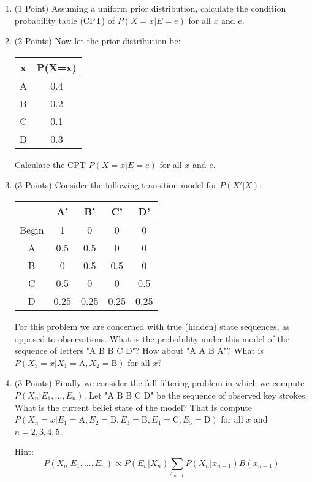 \documentclass[]{article}
\begin{document}
\begin{enumerate}[label=(\alph*)]
    \item (1 Point) Assuming a uniform prior distribution, calculate the condition probability table (CPT) of $P(X=x | E=e)$ for all $x$ and $e$.
    \item (2 Points) Now let the prior distribution be:
    \begin{table}[htb]
    \centering
        \begin{tabular}{|c|c|}
          \hline
            x & P(X=x) \\\hline
            A & 0.4 \\\hline
            B & 0.2 \\\hline
            C & 0.1 \\\hline
            D & 0.3 \\\hline
        \end{tabular}
    \end{table}
    
    Calculate the CPT $P(X=x | E=e)$ for all $x$ and $e$.
    \item (3 Points) Consider the following transition model for $P(X' | X)$:
    \begin{table}[!htb]
    \centering
        \begin{tabular}{|c|c|c|c|c|}
          \hline
             & A' & B' & C' & D' \\\hline
            Begin & 1 & 0 & 0 & 0 \\\hline
            A & 0.5 & 0.5 & 0 & 0 \\\hline
            B & 0 & 0.5 & 0.5 & 0 \\\hline
            C & 0.5 & 0 & 0 & 0.5 \\\hline
            D & 0.25 & 0.25 & 0.25 & 0.25 \\\hline
        \end{tabular}
    \end{table}
    
    For this problem we are concerned with true (hidden) state sequences, as opposed to observations. What is the probability under this model of the sequence of letters "A B B C D"? How about "A A B A"? What is $P(X_3=x | X_1 = \mathrm{A}, X_2 = \mathrm{B})$ for all $x$?
    
    \item (3 Points) Finally we consider the full filtering problem in which we compute $P(X_n | E_1, \ldots, E_n)$. Let "A B B C D" be the sequence of observed key strokes. What is the current belief state of the model? That is compute $P(X_n = x | E_1 = \mathrm{A}, E_2=\mathrm{B}, E_3=\mathrm{B}, E_4 = \mathrm{C}, E_5=\mathrm{D})$ for all $x$ and $n = 2, 3, 4, 5$.
    
    Hint: $$P(X_n | E_1, ..., E_n) \propto P(E_n|X_n)\sum_{x_{n-1}}P(X_n|x_{n-1})B(x_{n-1})$$
    
\end{enumerate}
\end{document}
